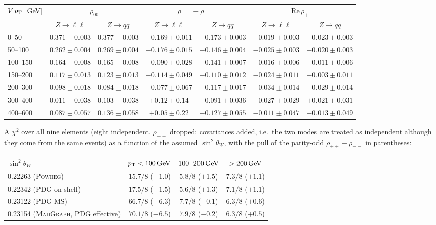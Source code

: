 \begin{center}
\footnotesize
\setlength{\tabcolsep}{3pt}
\begin{tabular}{lcccccc}
\toprule
$V$ $p_{\mathrm{T}}$ [GeV] & \multicolumn{2}{c}{$\rho_{00}$} & \multicolumn{2}{c}{$\rho_{++}-\rho_{--}$} & \multicolumn{2}{c}{$\mathrm{Re}\,\rho_{+-}$} \\
 & $Z\to\ell\ell$ & $Z\to q\bar q$ & $Z\to\ell\ell$ & $Z\to q\bar q$ & $Z\to\ell\ell$ & $Z\to q\bar q$ \\
\midrule
0--50 & $0.371 \pm 0.003$ & $0.377 \pm 0.003$ & $-0.169 \pm 0.011$ & $-0.173 \pm 0.003$ & $-0.019 \pm 0.003$ & $-0.023 \pm 0.003$ \\
50--100 & $0.262 \pm 0.004$ & $0.269 \pm 0.004$ & $-0.176 \pm 0.015$ & $-0.146 \pm 0.004$ & $-0.025 \pm 0.003$ & $-0.020 \pm 0.003$ \\
100--150 & $0.164 \pm 0.008$ & $0.165 \pm 0.008$ & $-0.090 \pm 0.028$ & $-0.141 \pm 0.007$ & $-0.016 \pm 0.006$ & $-0.011 \pm 0.006$ \\
150--200 & $0.117 \pm 0.013$ & $0.123 \pm 0.013$ & $-0.114 \pm 0.049$ & $-0.110 \pm 0.012$ & $-0.024 \pm 0.011$ & $-0.003 \pm 0.011$ \\
200--300 & $0.098 \pm 0.018$ & $0.084 \pm 0.018$ & $-0.077 \pm 0.067$ & $-0.117 \pm 0.017$ & $-0.034 \pm 0.014$ & $-0.029 \pm 0.014$ \\
300--400 & $0.011 \pm 0.038$ & $0.103 \pm 0.038$ & $+0.12 \pm 0.14$ & $-0.091 \pm 0.036$ & $-0.027 \pm 0.029$ & $+0.021 \pm 0.031$ \\
400--600 & $0.087 \pm 0.057$ & $0.136 \pm 0.058$ & $+0.05 \pm 0.22$ & $-0.127 \pm 0.055$ & $-0.011 \pm 0.047$ & $-0.013 \pm 0.049$ \\
\bottomrule
\end{tabular}
\end{center}
A $\chi^2$ over all nine elements (eight independent, $\rho_{--}$ dropped; covariances added, i.e.\ the two modes are
treated as independent although they come from the same events) as a function of the assumed $\sin^2\theta_W$, with
the pull of the parity-odd $\rho_{++}-\rho_{--}$ in parentheses:
\begin{center}
\small
\begin{tabular}{lccc}
\toprule
$\sin^2\theta_W$ & $p_{\mathrm{T}} < 100\,\mathrm{GeV}$ & $100$--$200\,\mathrm{GeV}$ & $> 200\,\mathrm{GeV}$ \\
\midrule
0.22263 (\textsc{Powheg}) & $15.7/8$ ($-1.0$) & $5.8/8$ ($+1.5$) & $7.3/8$ ($+1.1$) \\
0.22342 (PDG on-shell) & $17.5/8$ ($-1.5$) & $5.6/8$ ($+1.3$) & $7.1/8$ ($+1.1$) \\
0.23122 (PDG $\overline{\mathrm{MS}}$) & $66.7/8$ ($-6.3$) & $7.7/8$ ($-0.1$) & $6.3/8$ ($+0.6$) \\
0.23154 (\textsc{MadGraph}, PDG effective) & $70.1/8$ ($-6.5$) & $7.9/8$ ($-0.2$) & $6.3/8$ ($+0.5$) \\
\bottomrule
\end{tabular}
\end{center}
